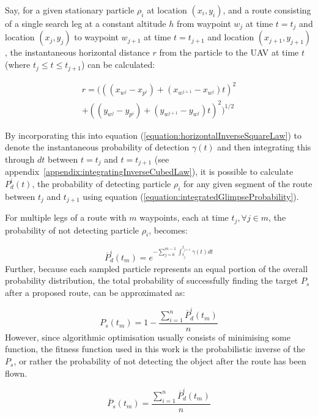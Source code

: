 \documentclass[10pt,a4paper, oneside, conference]{IEEEtran}
\begin{document}
	Say, for a given stationary particle $\rho_i$ at location $(x_{i},y_{i})$, and a route consisting of a single search leg at a constant altitude $h$ from waypoint $w_j$ at time $t=t_j$ and location $(x_{j},y_{j})$ to waypoint $w_{j+1}$ at time $t=t_{j+1}$ and location $(x_{j+1},y_{j+1})$, the instantaneous horizontal distance $r$ from the particle to the UAV at time $t$ (where $t_j\leq t \leq t_{j+1}$) can be calculated:

\begin{equation}
	\label{equation:particleWpDistance}
\begin{split}
r = (((x_{w^j}-x_{p^i})+(x_{w^{j+1}}-x_{w^j}) t)^2\\
 + ((y_{w^j}-y_{p^i})+(y_{w^{j+1}}-y_{w^j}) t)^2)^{1/2}
\end{split}
\end{equation}
	
	By incorporating this into equation (\ref{equation:horizontalInverseSquareLaw}) to denote the instantaneous probability of detection $\gamma(t)$ and then integrating this through $dt$ between $t=t_j$ and $t=t_{j+1}$ (see appendix~\ref{appendix:integratingInverseCubedLaw}), it is possible to calculate $P^i_d(t)$, the probability of detecting particle $\rho_i$ for any given segment of the route between $t_j$ and $t_{j+1}$ using equation (\ref{equation:integratedGlimpseProbability}).

	For multiple legs of a route with $m$ waypoints, each at time $t_j,\forall j \in m$, the probability of not detecting particle $\rho_i$, becomes:
		
		\begin{equation}
		\overline{P}_d^i(t_m)=e^{-\sum_{j=0}^{m-1}{\int_{t_j}^{t_{j+1}} \gamma(t) dt}}
		\end{equation}
	Further, because each sampled particle represents an equal portion of the overall probability distribution, the total probability of successfully finding the target $P_s$ after a proposed route, can be approximated as:
	
	\begin{equation}
	\label{equation:continuousWP-POS}
	P_s(t_m)=1-\frac{\sum_{i=1}^{n}{\overline{P}_d^i(t_m)}}{n}
	\end{equation}
	However, since algorithmic optimisation usually consists of minimising some function, the fitness function used in this work is the probabilistic inverse of the $P_s$, or rather the probability of not detecting the object after the route has been flown.
	
	\begin{equation}
	\label{equation:continuousWP-POSfitness}
	\overline{P}_s(t_m)=\frac{\sum_{i=1}^{n}{\overline{P}_d^i(t_m)}}{n}
	\end{equation}
	
\end{document}
